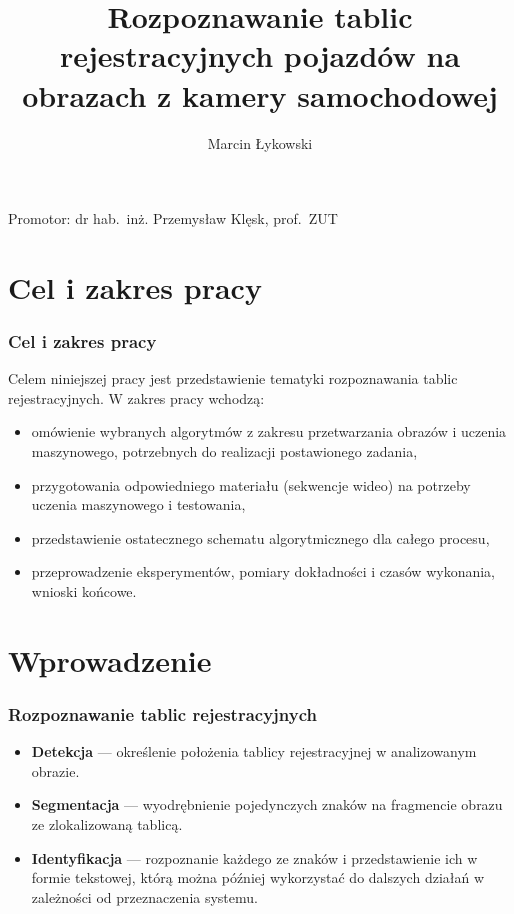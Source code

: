 \documentclass{beamer}
\title{Rozpoznawanie tablic rejestracyjnych pojazdów \linebreak na obrazach z kamery samochodowej}
\author{Marcin Łykowski}
\begin{document}
    \begin{frame}
        \maketitle
        \centering
        Promotor: dr hab.~inż. Przemysław Klęsk, prof.~ZUT
    \end{frame}


    \section{Cel i zakres pracy}
    \begin{frame}
        \frametitle{Cel i zakres pracy}
        Celem niniejszej pracy jest przedstawienie tematyki rozpoznawania tablic rejestracyjnych.
        W zakres pracy wchodzą:
        \begin{itemize}
            \item omówienie wybranych algorytmów z zakresu przetwarzania obrazów i uczenia maszynowego, potrzebnych do realizacji postawionego zadania,
            \item przygotowania odpowiedniego materiału (sekwencje wideo) \linebreak na potrzeby uczenia maszynowego i testowania,
            \item przedstawienie ostatecznego schematu algorytmicznego \linebreak dla całego procesu,
            \item przeprowadzenie eksperymentów, pomiary dokładności \linebreak i czasów wykonania, wnioski końcowe.
        \end{itemize}
    \end{frame}


    \section{Wprowadzenie}

    \begin{frame}
        \frametitle{Rozpoznawanie tablic rejestracyjnych}
        \begin{itemize}
            \item \textbf{Detekcja} --- określenie położenia tablicy rejestracyjnej \linebreak w analizowanym obrazie.
            \item \textbf{Segmentacja} --- wyodrębnienie pojedynczych znaków \linebreak na fragmencie obrazu ze zlokalizowaną tablicą.
            \item \textbf{Identyfikacja} --- rozpoznanie każdego ze znaków \linebreak i przedstawienie ich w formie tekstowej, którą można później wykorzystać do dalszych działań w zależności od przeznaczenia systemu.
        \end{itemize}
    \end{frame}
\end{document}
